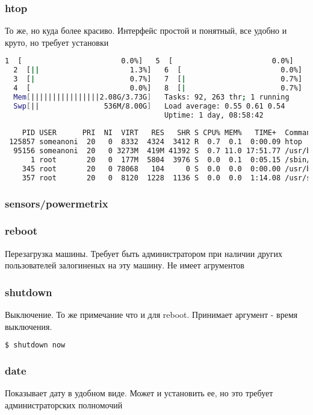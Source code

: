 \documentclass[11pt]{article}
\begin{document}
\subsubsection*{htop}
То же, но куда более красиво. Интерфейс простой и понятный, все удобно и круто, но требует установки
\begin{lstlisting}[language=bash]
  1  [                       0.0%]   5  [                       0.0%]       
  2  [||                     1.3%]   6  [                       0.0%]       
  3  [|                      0.7%]   7  [|                      0.7%]       
  4  [                       0.0%]   8  [|                      0.7%]       
  Mem[||||||||||||||||2.08G/3.73G]   Tasks: 92, 263 thr; 1 running          
  Swp[||               536M/8.00G]   Load average: 0.55 0.61 0.54           
                                     Uptime: 1 day, 08:58:42                
                                                                            
    PID USER      PRI  NI  VIRT   RES   SHR S CPU% MEM%   TIME+  Command    
 125857 someanoni  20   0  8332  4324  3412 R  0.7  0.1  0:00.09 htop       
  95156 someanoni  20   0 3273M  419M 41392 S  0.7 11.0 17:51.77 /usr/bin/t 
      1 root       20   0  177M  5804  3976 S  0.0  0.1  0:05.15 /sbin/init 
    345 root       20   0 78068   104     0 S  0.0  0.0  0:00.00 /usr/bin/l 
    357 root       20   0  8120  1228  1136 S  0.0  0.0  1:14.08 /usr/sbin/ 
\end{lstlisting}
\subsubsection*{sensors/powermetrix}
\subsubsection*{reboot}
Перезагрузка машины. Требует быть администратором при наличии других пользователей залогиненых на эту машину. Не имеет агрументов
\subsubsection*{shutdown}
Выключение. То же примечание что и для reboot. Принимает аргумент - время выключения.
\begin{lstlisting}[language=bash]
 $ shutdown now
\end{lstlisting}
\subsubsection*{date}
Показывает дату в удобном виде. Может и установить ее, но это требует администраторских полномочий
\end{document}
